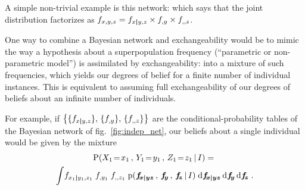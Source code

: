\documentclass[\ifafour a4paper,12pt,\else a5paper,10pt,\fi%
onecolumn,oneside,article,%
british%
]{memoir}
\theoremstyle{remark}
\theoremstyle{innote}
\newcommand*{\di}{\mathrm{d}}%
\DeclarePairedDelimiter\set{\{}{\}}
\newcommand*{\pf}{\mathrm{p}}%
\newcommand*{\p}{\mathrm{P}}%
\renewcommand*{\|}[1][]{\nonscript\,#1\vert\nonscript\,\mathopen{}}
\newcommand*{\fig}{fig.}%
\renewcommand*{\=}{\TextOrMath\texteq\eq}
\newcommand*{\X}[1]{X_{#1}}
\newcommand*{\x}[1]{x_{#1}}
\newcommand*{\A}[1]{A_{#1}}
\newcommand*{\B}[1]{B_{#1}}
\newcommand*{\Y}[1]{Y_{#1}}
\newcommand*{\y}[1]{y_{#1}}
\newcommand*{\Z}[1]{Z_{#1}}
\newcommand*{\z}[1]{z_{#1}}
\newcommand*{\sx}{\mathfrak{X}}
\newcommand*{\sy}{\mathfrak{Y}}
\newcommand*{\sz}{\mathfrak{Z}}
\newcommand*{\ff}[1]{f_{#1}}
\newcommand*{\ffb}[1]{\bm{f_{\!#1}}}
\newcommand*{\bcond}[1][]{\nonscript\,#1\bm{\vert}\nonscript\;\mathopen{}}
\begin{document}
A simple non-trivial example is this network:
which says that the joint distribution factorizes as
$\ff{x,y,z} = \ff{x \bcond y,z} \times \ff{,y} \times \ff{,,z}$.


One way to combine a Bayesian network and exchangeability would be to mimic
the way a hypothesis about a superpopulation frequency (\enquote{parametric
  or non-parametric model}) is assimilated by exchangeability: into a
mixture of such frequencies, which yields our degrees of belief for a
finite number of individual instances. This is equivalent to assuming full
exchangeability of our degrees of beliefs about an infinite number of
individuals.

For example, if
$\set[\big]{\set{\ff{x \bcond y,z}},\, \set{\ff{,y}},\, \set{\ff{,,z}}}$
are the conditional-probability tables of the Bayesian network of
\fig~\ref{fig:indep_net}, our beliefs about a single individual would
be given by the mixture
\begin{multline}
  \label{eq:example_mix_bayesnet1}
\p( \X{1}\=\x{1} \,,\, \Y{1}\=\y{1} \,,\, \Z{1}\=\z{1} \| I)
   ={}\\
     \int\!
     \ff{x_{1} \bcond y_{1},z_{1}}\; \ff{,y_{1}}\; \ff{,,z_{1}} \;
\pf(\ffb{x \bcond y z}\,,\, \ffb{y} \,,\, \ffb{z} \| I)
\;\di\ffb{x \bcond y z} \,\di\ffb{y} \,\di\ffb{z} \;.
\end{multline}
\end{document}
